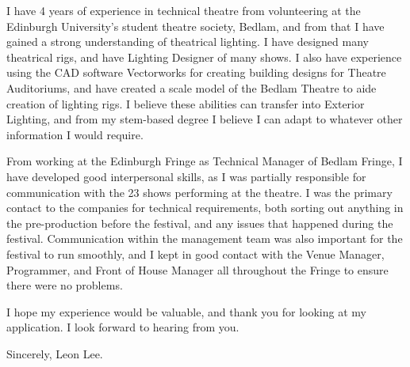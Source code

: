 \documentclass[10pt,english]{article}
\begin{document}
\medskip

I have 4 years of experience in technical theatre from volunteering at the Edinburgh University's student theatre society, Bedlam, and from that I have gained a strong understanding of theatrical lighting. I have designed many theatrical rigs, and have Lighting Designer of many shows. I also have experience using the CAD software Vectorworks for creating building designs for Theatre Auditoriums, and have created a scale model of the Bedlam Theatre to aide creation of lighting rigs. I believe these abilities can transfer into Exterior Lighting, and from my stem-based degree I believe I can adapt to whatever other information I would require.

\medskip

From working at the Edinburgh Fringe as Technical Manager of Bedlam Fringe, I have developed good interpersonal skills, as I was partially responsible for communication with the 23 shows performing at the theatre. I was the primary contact to the companies for technical requirements, both sorting out anything in the pre-production before the festival, and any issues that happened during the festival. Communication within the management team was also important for the festival to run smoothly, and I kept in good contact with the Venue Manager, Programmer, and Front of House Manager all throughout the Fringe to ensure there were no problems.

\medskip

I hope my experience would be valuable, and thank you for looking at my application. I look forward to hearing from you.

Sincerely,
Leon Lee.
\end{document}

